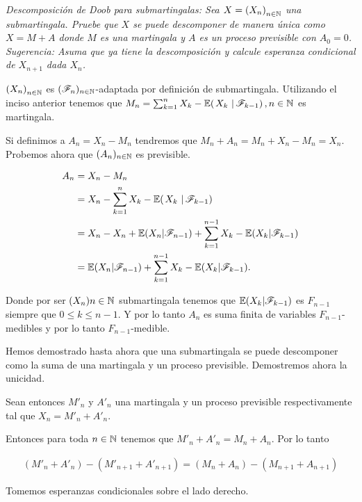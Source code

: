 \emph{
    Descomposici\'on de Doob para submartingalas: Sea $X=\left( X_n\right) _{n\in\mathbb{N}}$ una submartingala. 
    Pruebe que $X$ se puede descomponer de manera \'unica como $X=M+A$ donde $M$ es una martingala y $A$ 
    es un proceso previsible con $A_0=0$. Sugerencia: Asuma que ya tiene la descomposici\'on y calcule 
    esperanza condicional de $X_{n+1}$ dada $X_n$. 
}

\afterstatement\pn

$\left( X_n\right) _{n\in\mathbb{N}}$ es $(\mathscr{F}_n)_{n \in \mathbb{N}}$-adaptada por definición de submartingala. Utilizando el inciso anterior tenemos
que $M_n = \sum_{k=1}^n X_k-\espc{X_k}{\F_{k-1}}, n \in \N$ es martingala.\pn

Si definimos a $A_n = X_n - M_n$ tendremos que $M_n + A_n = M_n + X_n - M_n = X_n$. Probemos ahora que
$(A_n)_{n \in \mathbb{N}}$ es previsible.\pn

\begin{align}
    A_n     &=      X_n - M_n                                                                   \\
            &=      X_n - \sum_{k=1}^n X_k-\espc{X_k}{\F_{k-1}}                                 \\
            &=      X_n - X_n + \E(X_n | \F_{n-1}) + \sum_{k=1}^{n-1} X_k-\E(X_k|\F_{k-1})      \\     
            &=      \E(X_n | \F_{n-1}) + \sum_{k=1}^{n-1} X_k-\E(X_k|\F_{k-1}).     
\end{align}\pn

Donde por ser $(X_n){n \in \mathbb{N}}$ submartingala tenemos que $\mathbb{E}(X_k|\mathscr{F}_{k-1})$ es $F_{n-1}$ siempre que $0 \leq k \leq n-1$.
Y por lo tanto $A_n$ es suma finita de variables $F_{n-1}$-medibles y por lo tanto $F_{n-1}$-medible.\pn

Hemos demostrado hasta ahora que una submartingala se puede descomponer como la suma de una martingala y un proceso previsible.
Demostremos ahora la unicidad.\pn

Sean entonces $M'_n$ y $A'_n$ una martingala y un proceso previsible respectivamente tal que $X_n = M'_n + A'_n$.\pn

Entonces para toda $n \in \mathbb{N}$ tenemos que $M'_n + A'_n = M_n + A_n$. Por lo tanto 

\begin{align}
    (M'_n + A'_n) - (M'_{n+1} + A'_{n+1}) = (M_n + A_n) - (M_{n+1} + A_{n+1})
\end{align}\pn

Tomemos esperanzas condicionales sobre el lado derecho.

